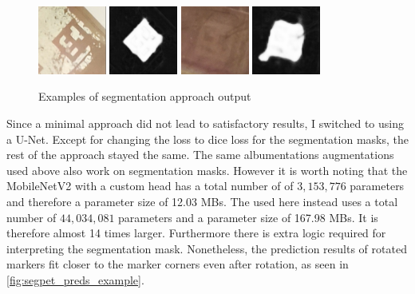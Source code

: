 \documentclass[10pt]{book}
\begin{document}
\begin{figure}
  \centering
     {\includegraphics[width=0.2\textwidth]{image/segpet_1_in}}
     {\includegraphics[width=0.2\textwidth]{image/segpet_1_pred}}
     {\includegraphics[width=0.2\textwidth]{image/segpet_3_in}}
     {\includegraphics[width=0.2\textwidth]{image/segpet_3_pred}}
  \caption{Examples of segmentation approach output}
  \label{fig:segpet_preds_example}
\end{figure}

Since a minimal approach did not lead to satisfactory results, I switched to using a U-Net. Except for changing the loss to dice loss for the segmentation masks, the rest of the approach stayed the same. The same albumentations augmentations used above also work on segmentation masks. However it is worth noting that the MobileNetV2 with a custom head has a total number of of $3,153,776$ parameters and therefore a parameter size of 12.03 \acp{MB}. The used here instead uses a total number of $44,034,081$ parameters and a parameter size of 167.98 \acp{MB}. It is therefore almost 14 times larger. Furthermore there is extra logic required for interpreting the segmentation mask. Nonetheless, the prediction results of rotated markers fit closer to the marker corners even after rotation, as seen in \autoref{fig:segpet_preds_example}. 
\end{document}
